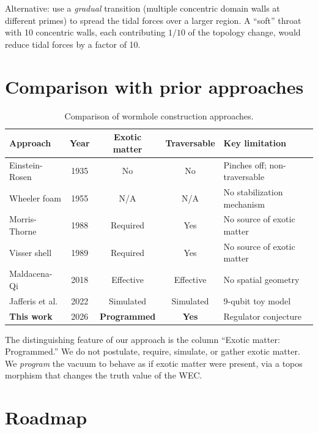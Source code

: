 \documentclass[11pt,a4paper]{article}
\begin{document}
Alternative: use a \emph{gradual} transition (multiple concentric
domain walls at different primes) to spread the tidal forces
over a larger region. A ``soft'' throat with 10 concentric walls,
each contributing $1/10$ of the topology change, would reduce
tidal forces by a factor of 10.

\section{Comparison with prior approaches}
\label{sec:comparison}

\begin{table}[t]
\centering
\caption{Comparison of wormhole construction approaches.}
\label{tab:comparison}
\small
\begin{tabular}{@{}p{3cm}cccp{4cm}@{}}
\toprule
Approach & Year & Exotic matter & Traversable & Key limitation \\
\midrule
Einstein-Rosen & 1935 & No & No & Pinches off; non-traversable \\
Wheeler foam & 1955 & N/A & N/A & No stabilization mechanism \\
Morris-Thorne & 1988 & Required & Yes & No source of exotic matter \\
Visser shell & 1989 & Required & Yes & No source of exotic matter \\
Maldacena-Qi & 2018 & Effective & Effective & No spatial geometry \\
Jafferis et al. & 2022 & Simulated & Simulated & 9-qubit toy model \\
\midrule
\textbf{This work} & 2026 & \textbf{Programmed} & \textbf{Yes} & Regulator conjecture \\
\bottomrule
\end{tabular}
\end{table}

The distinguishing feature of our approach is the column
``Exotic matter: Programmed.'' We do not postulate, require,
simulate, or gather exotic matter. We \emph{program} the vacuum
to behave as if exotic matter were present, via a topos morphism
that changes the truth value of the WEC.

\section{Roadmap}
\label{sec:roadmap}
\end{document}
